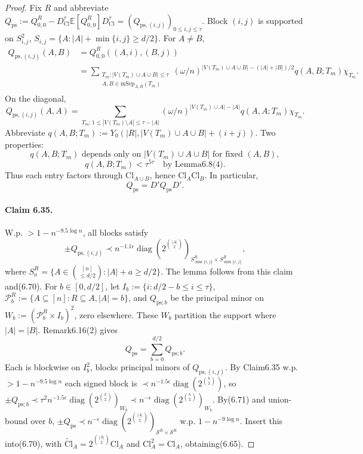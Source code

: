 \documentclass[10pt,a4paper]{article}
\begin{document}
\begin{proof}Fix $R$ and abbreviate $Q_{\mathrm{ps}}:=Q_{0,0}^R-D_{\mathrm{Cl}}^\tau\mathbb E[Q_{0,0}^R]D_{\mathrm{Cl}}^\tau=(Q_{\mathrm{ps},(i,j)})_{0\le i,j\le\tau}$. Block $(i,j)$ is supported on $S_{i,j}^2$, $S_{i,j}=\{A:|A|+\min\{i,j\}\ge d/2\}$. For $A\ne B$,
\begin{align*}Q_{\mathrm{ps},(i,j)}(A,B)&=Q_{0,0}^R((A,i),(B,j))\\&=\sum_{\substack{T_m:|V(T_m)\cup A\cup B|\le\tau\\A,B\in\mathrm{mSep}_{A,B}(T_m)}}(\omega/n)^{|V(T_m)\cup A\cup B|-(|A|+|B|)/2}q(A,B;T_m)\chi_{T_m}.\tag{6.66}\end{align*}
On the diagonal,
\[Q_{\mathrm{ps},(i,j)}(A,A)=\sum_{T_m:1\le|V(T_m)\setminus A|\le\tau-|A|}(\omega/n)^{|V(T_m)\cup A|-|A|}q(A,A;T_m)\chi_{T_m}.\tag{6.67}\]
Abbreviate $q(A,B;T_m):=Y_0(|R|,|V(T_m)\cup A\cup B|+(i+j))$. Two properties:
\[q(A,B;T_m)\text{ depends only on }|V(T_m)\cup A\cup B|\text{ for fixed }(A,B),\tag{6.68}\]
\[q(A,B;T_m)<\tau^{5\tau}\quad\text{by Lemma6.8(4)}.\tag{6.69}\]
Thus each entry factors through $\mathrm{Cl}_{A\cup B}$, hence $\mathrm{Cl}_A\mathrm{Cl}_B$. In particular,
\[Q_{\mathrm{ps}}=D'Q_{\mathrm{ps}}D'.\tag{6.70}\]
\paragraph{Claim 6.35.} W.p. $>1-n^{-9.5\log n}$, all blocks satisfy
\[\pm Q_{\mathrm{ps},(i,j)}\prec n^{-1.1\epsilon}\operatorname{diag}(2^{\binom{|A|}2})_{S^R_{\min\{i,j\}}\times S^R_{\min\{i,j\}}},\]
where $S_a^R=\{A\in\binom{[n]}{\le d/2}:|A|+a\ge d/2\}$.
The lemma follows from this claim and(6.70). For $b\in[0,d/2]$, let $I_b:=\{i:d/2-b\le i\le\tau\}$, $\mathcal P_b^R:=\{A\subseteq[n]:R\subseteq A,|A|=b\}$, and $Q_{\mathrm{ps};b}$ be the principal minor on $W_b:=(\mathcal P_b^R\times I_b)^2$, zero elsewhere. These $W_b$ partition the support where $|A|=|B|$. Remark6.16(2) gives
\[Q_{\mathrm{ps}}=\sum_{b=0}^{d/2}Q_{\mathrm{ps};b}.\tag{6.71}\]
Each is blockwise on $I_b^2$, blocks principal minors of $Q_{\mathrm{ps},(i,j)}$. By Claim6.35 w.p. $>1-n^{-9.5\log n}$ each signed block is $\prec n^{-1.5\epsilon}\operatorname{diag}(2^{\binom b2})$, so $\pm Q_{\mathrm{ps};b}\prec\tau^2n^{-1.5\epsilon}\operatorname{diag}(2^{\binom b2})_{W_b}\prec n^{-\epsilon}\operatorname{diag}(2^{\binom b2})_{W_b}$. By(6.71) and union-bound over $b$, $\pm Q_{\mathrm{ps}}\prec n^{-\epsilon}\operatorname{diag}(2^{\binom{|A|}2})_{\mathcal S^R\times\mathcal S^R}$ w.p. $1-n^{-9\log n}$. Insert this into(6.70), with $\widetilde{\mathrm{Cl}}_A=2^{\binom{|A|}2}\mathrm{Cl}_A$ and $\mathrm{Cl}_A^2=\mathrm{Cl}_A$, obtaining(6.65).\end{proof}
\end{document}
